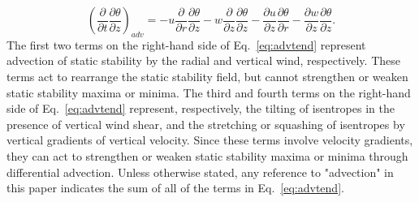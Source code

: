 \documentclass{ametsoc}
\begin{document}
   \begin{equation} \label{eq:advtend}
   \left(\frac{\partial}{\partial t}\frac{\partial \theta}{\partial z}\right)_{adv} = -u\frac{\partial}{\partial r}\frac{\partial \theta}{\partial z}-w\frac{\partial}{\partial z}\frac{\partial \theta}{\partial z}-\frac{\partial u}{\partial z}\frac{\partial \theta}{\partial r}-\frac{\partial w}{\partial z}\frac{\partial \theta}{\partial z}.
   \end{equation}
The first two terms on the right-hand side of Eq.~\ref{eq:advtend} represent advection of static stability by the radial and vertical wind, respectively.
These terms act to rearrange the static stability field, but cannot strengthen or weaken static stability maxima or minima.
The third and fourth terms on the right-hand side of Eq.~\ref{eq:advtend} represent, respectively, the tilting of isentropes in the presence of vertical wind shear, and the stretching or squashing of isentropes by vertical gradients of vertical velocity.
Since these terms involve velocity gradients, they can act to strengthen or weaken static stability maxima or minima through differential advection.
Unless otherwise stated, any reference to "advection" in this paper indicates the sum of all of the terms in Eq.~\ref{eq:advtend}.
\end{document}
